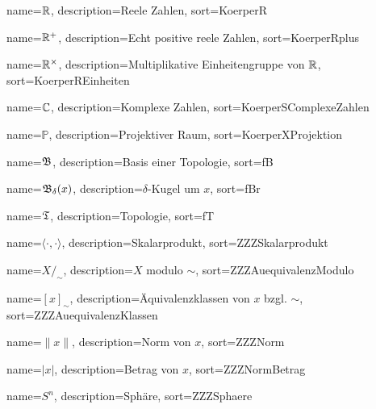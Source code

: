 {
  name={\ensuremath{\mdr}},
  description={Reele Zahlen},
  sort=KoerperR
}

{
  name={\ensuremath{\mdr^+}},
  description={Echt positive reele Zahlen},
  sort=KoerperRplus
}

{
  name={\ensuremath{\mdr^\times}},
  description={Multiplikative Einheitengruppe von $\mathbb{R}$},
  sort=KoerperREinheiten
}

{
  name={\ensuremath{\mdc}},
  description={Komplexe Zahlen},
  sort=KoerperSComplexeZahlen
}

{
  name={\ensuremath{\mathbb{P}}},
  description={Projektiver Raum},
  sort=KoerperXProjektion
}

{
  name={\ensuremath{\fB}},
  description={Basis einer Topologie},
  sort=fB
}

{
  name={\ensuremath{\fB_\delta(x)}},
  description={$\delta$-Kugel um $x$},
  sort=fBr
}

{
  name={\ensuremath{\fT}},
  description={Topologie},
  sort=fT
}

{
  name={\ensuremath{\langle \cdot , \cdot \rangle}},
  description={Skalarprodukt},
  sort=ZZZSkalarprodukt
}

{
  name={\ensuremath{X /_\sim}},
  description={$X$ modulo $\sim$},
  sort=ZZZAuequivalenzModulo
}

{
  name={\ensuremath{[x]_\sim}},
  description={Äquivalenzklassen von $x$ bzgl. $\sim$},
  sort=ZZZAuequivalenzKlassen
}

{
  name={\ensuremath{\| x \|}},
  description={Norm von $x$},
  sort=ZZZNorm
}

{
  name={\ensuremath{| x |}},
  description={Betrag von $x$},
  sort=ZZZNormBetrag
}

{
  name={\ensuremath{S^n}},
  description={Sphäre},
  sort=ZZZSphaere
}

